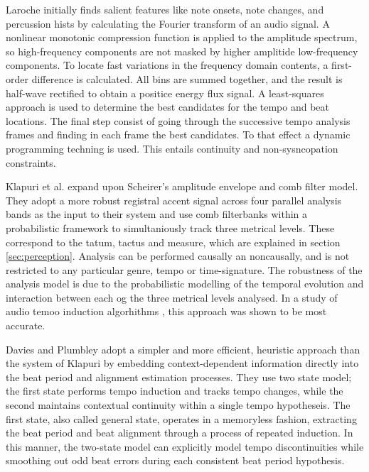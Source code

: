\documentclass{scrartcl}
\begin{document}


Laroche \cite{Laroche2003} initially finds salient features like note onsets, note changes, and percussion hists by calculating the Fourier transform of an audio signal. A nonlinear monotonic compression function is applied to the amplitude spectrum, so high-frequency components are not masked by higher amplitide low-frequency components. To locate fast variations in the frequency domain contents, a first-order difference is calculated. All bins are summed together, and the result is half-wave rectified to obtain a positice energy flux signal. A least-squares approach is used to determine the best candidates for the tempo and beat locations. The final step consist of going through the successive tempo analysis frames and finding in each frame the best candidates. To that effect a dynamic programming techning is used. This entails continuity and non-sysncopation constraints. 


Klapuri et al. \cite{Klapuri2005} expand upon Scheirer's amplitude envelope and comb filter model. They adopt a more robust registral accent signal across four parallel analysis bands as the input to their system and use comb filterbanks within a probabilistic framework to simultaniously track three metrical levels. These correspond to the tatum, tactus and measure, which are explained in section \ref{sec:perception}. Analysis can be performed causally an noncausally, and is not restricted to any particular genre, tempo or time-signature. The robustness of the analysis model is due to the probabilistic modelling of the temporal evolution and interaction between each og the three metrical levels analysed. In a study of audio temoo induction algorhithms \cite{Gouyon2006b}, this approach was shown to be most accurate.


Davies and Plumbley \cite{Davies2007} adopt a simpler and more efficient, heuristic approach than the system of Klapuri by embedding context-dependent information directly into the beat period and alignment estimation processes. They use two state model; the first state performs tempo induction and tracks tempo changes, while the second maintains contextual continuity within a single tempo hypotheseis. The first state, also called general state, operates in a memoryless fashion, extracting the beat period and beat alignment through a process of repeated induction. In this manner, the two-state model can explicitly model tempo discontinuities while smoothing out odd beat errors during each consistent beat period hypothesis. 
\end{document}
